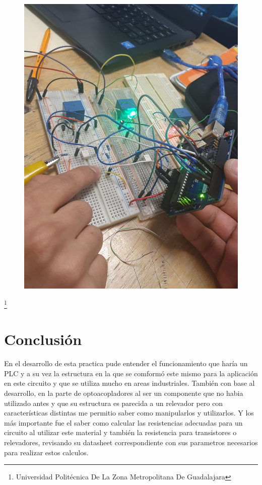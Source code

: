 \documentclass[11pt,a4paper]{article}
\begin{document}
\begin{figure}[hbtp]
\centering
\includegraphics[scale=0.27]{005.png} 
\end{figure}
\footnote{Universidad Politécnica De La Zona Metropolitana De Guadalajara}
\newpage
\section{Conclusión}
En el desarrollo de esta practica pude entender el funcionamiento que haría un PLC y a su vez la estructura en la que se comformó este mismo para la aplicación en este circuito y que se utiliza mucho en areas industriales. También con base al desarrollo, en la parte de optoacopladores al ser un componente que no habia utilizado antes y que su estructura es parecida a un relevador pero con características distintas me permitio saber como manipularlos y utilizarlos. Y los más importante fue el saber como calcular las resistencias adecuadas para un circuito al utilizar este material y también la resistencia para transistores o relevadores, revisando su datasheet correspondiente con sus parametros necesarios para realizar estos calculos.
\end{document}
